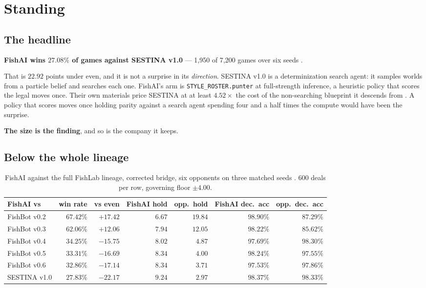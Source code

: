 \documentclass[11pt]{article}
\newcommand{\code}[1]{\texttt{#1}}
\begin{document}
\section{Standing}
\label{sec:standing}

\subsection{The headline}

\textbf{FishAI wins $27.08\%$ of games against SESTINA v1.0} --- 1{,}950 of 7{,}200 games over six
seeds \cite{crossplay}.

That is $22.92$ points under even, and it is not a surprise in its \emph{direction}. SESTINA v1.0 is
a determinization search agent: it samples worlds from a particle belief and searches each one.
FishAI's arm is \code{STYLE\_ROSTER.punter} at full-strength inference, a heuristic policy that
scores the legal moves once. Their own materials price SESTINA at at least $4.52\times$ the cost of
the non-searching blueprint it descends from \cite{fishlab}. A policy that scores moves once holding
parity against a search agent spending four and a half times the compute would have been the
surprise.

\textbf{The size is the finding}, and so is the company it keeps.

\subsection{Below the whole lineage}

\begin{table}[t]
\centering
\caption{FishAI against the full FishLab lineage, corrected bridge, six opponents on three matched
seeds \cite{loses}. 600 deals per row, governing floor $\pm 4.00$.}
\label{tab:lineage}
\footnotesize
\begin{tabular}{@{}lrrrrrr@{}}
\toprule
FishAI vs & win rate & vs even & FishAI hold & opp.\ hold & FishAI dec.\ acc & opp.\ dec.\ acc \\
\midrule
FishBot v0.2 & $\mathbf{67.42\%}$ & $+17.42$ & $6.67$ & $19.84$ & $98.90\%$ & $87.29\%$ \\
FishBot v0.3 & $\mathbf{62.06\%}$ & $+12.06$ & $7.94$ & $12.05$ & $98.22\%$ & $85.62\%$ \\
FishBot v0.4 & $\mathbf{34.25\%}$ & $-15.75$ & $8.02$ & $4.87$  & $97.69\%$ & $98.30\%$ \\
FishBot v0.5 & $\mathbf{33.31\%}$ & $-16.69$ & $8.34$ & $4.00$  & $98.24\%$ & $97.55\%$ \\
FishBot v0.6 & $\mathbf{32.86\%}$ & $-17.14$ & $8.34$ & $3.71$  & $97.53\%$ & $97.86\%$ \\
SESTINA v1.0 & $\mathbf{27.83\%}$ & $-22.17$ & $9.24$ & $2.97$  & $98.37\%$ & $98.33\%$ \\
\bottomrule
\end{tabular}
\end{table}
\end{document}
